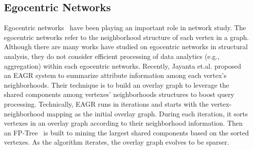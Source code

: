 \subsection{Egocentric Networks}
Egocentric networks~\cite{ma2010ego,marsden2002egocentric} 
have been playing an important role in network study. The egocentric networks
refer to the neighborhood structure of each vertex
in a graph. Although there are many works have studied on egocentric
networks in structural analysis, they do not consider efficient processing 
of data analytics (e.g., aggregation) within each egocentric networks. 
Recently, Jayanta et.al. \cite{mondal2014eagr} 
proposed an EAGR system to summarize attribute information among 
each vertex's neighborhoods. Their technique is to build an overlay graph 
to leverage the shared components among vertexes' neighborhoods structures to
boost query processing.
%
Technically, EAGR runs in iterations and starts with the vertex-neighborhood mapping
as the initial overlay graph. During each iteration,
it sorts vertexes in an overlay graph according to their neighborhood information. 
Then an FP-Tree~\cite{han2000mining} is built to mining the largest shared components based
on the sorted vertexes.
As the algorithm iterates, the overlay graph evolves to be sparser. 

%
%


